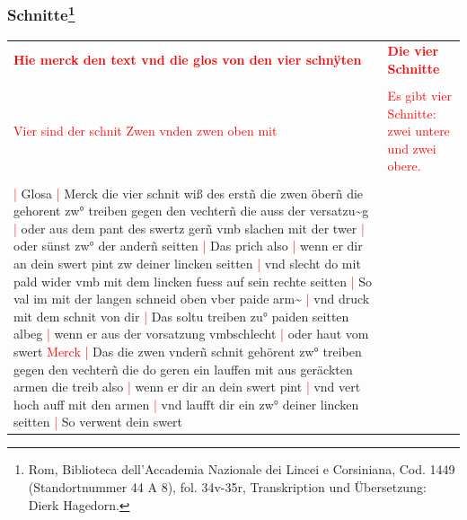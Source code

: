 \newpage

\begin{center}
\end{center}

\newpage

\subsubsection[Schnitte]{
    Schnitte\footnote{
        \hspace*{0.5ex}Rom, Biblioteca dell'Accademia Nazionale dei Lincei e Corsiniana,
        Cod. 1449 (Standortnummer 44 A 8), fol. 34v-35r, Transkription und Übersetzung: Dierk Hagedorn.}}

\begin{longtable}{p{6.25cm}p{6.25cm}}
    \textbf{\textcolor{red}{
        Hie merck den text vnd die glos von den vier schnÿten}}
    &
    \textbf{\textcolor{red}{
        Die vier Schnitte}}
    \\
    \\
    \textcolor{red}{
        Vier sind der schnit Zwen vnden zwen oben mit}
    &
    \textcolor{red}{
        Es gibt vier Schnitte: zwei untere und zwei obere.}
    \\
    \\
    \textcolor{red}{|} Glosa
    \textcolor{red}{|} Merck die vier schnit wiß des erstñ die zwen öberñ die gehorent zw° treiben gegen den vechterñ die auss der versatzu\textasciitilde{}g
    \textcolor{red}{|} oder aus dem pant des swertz gerñ vmb slachen mit der twer
    \textcolor{red}{|} oder sünst zw° der anderñ seitten
    \textcolor{red}{|} Das prich also
    \textcolor{red}{|} wenn er dir an dein swert pint zw deiner lincken seitten
    \textcolor{red}{|} vnd slecht do mit pald wider vmb mit dem lincken fuess auf sein rechte seitten
    \textcolor{red}{|} So val im mit der langen schneid oben vber paide arm\textasciitilde{}
    \textcolor{red}{|} vnd druck mit dem schnit von dir
    \textcolor{red}{|} Das soltu treiben zu° paiden seitten albeg
    \textcolor{red}{|} wenn er aus der vorsatzung vmbschlecht
    \textcolor{red}{|} oder haut vom swert \textcolor{red}{Merck}
    \textcolor{red}{|} Das die zwen vnderñ schnit gehörent zw° treiben gegen den vechterñ die do geren ein lauffen mit aus geräckten armen die treib also
    \textcolor{red}{|} wenn er dir an dein swert pint
    \textcolor{red}{|} vnd vert hoch auff mit den armen
    \textcolor{red}{|} vnd laufft dir ein zw° deiner lincken seitten
    \textcolor{red}{|} So verwent dein swert

\end{longtable}
